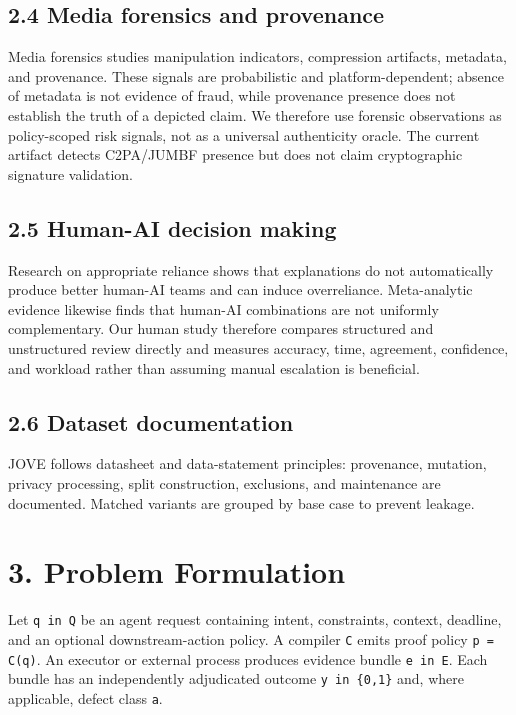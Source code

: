 \documentclass[11pt]{article}
\begin{document}
\subsection{2.4 Media forensics and provenance}

Media forensics studies manipulation indicators, compression artifacts, metadata, and provenance. These signals are probabilistic and platform-dependent; absence of metadata is not evidence of fraud, while provenance presence does not establish the truth of a depicted claim. We therefore use forensic observations as policy-scoped risk signals, not as a universal authenticity oracle. The current artifact detects C2PA/JUMBF presence but does not claim cryptographic signature validation.\par

\subsection{2.5 Human-AI decision making}

Research on appropriate reliance shows that explanations do not automatically produce better human-AI teams and can induce overreliance. Meta-analytic evidence likewise finds that human-AI combinations are not uniformly complementary. Our human study therefore compares structured and unstructured review directly and measures accuracy, time, agreement, confidence, and workload rather than assuming manual escalation is beneficial.\par

\subsection{2.6 Dataset documentation}

JOVE follows datasheet and data-statement principles: provenance, mutation, privacy processing, split construction, exclusions, and maintenance are documented. Matched variants are grouped by base case to prevent leakage.\par

\section{3. Problem Formulation}

Let \texttt{q  in  Q} be an agent request containing intent, constraints, context, deadline, and an optional downstream-action policy. A compiler \texttt{C} emits proof policy \texttt{p = C(q)}. An executor or external process produces evidence bundle \texttt{e  in  E}. Each bundle has an independently adjudicated outcome \texttt{y  in  \{0,1\}} and, where applicable, defect class \texttt{a}.\par
\end{document}
